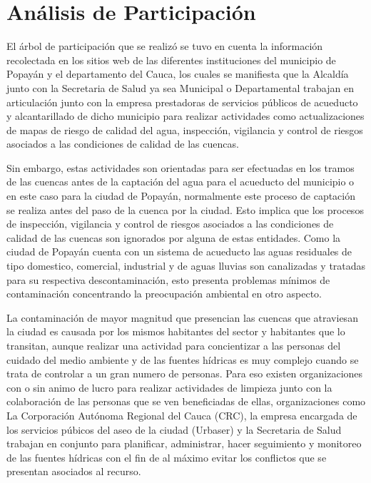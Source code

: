 \section{Análisis de Participación}
  
  El árbol de participación que se realizó se tuvo en cuenta la información recolectada en los sitios web de las diferentes instituciones del municipio de Popayán y el departamento del Cauca, los cuales se manifiesta que la Alcaldía junto con la Secretaria de Salud ya sea Municipal o Departamental trabajan en articulación junto con la empresa prestadoras de servicios públicos de acueducto y alcantarillado de dicho municipio para realizar actividades como actualizaciones de mapas de riesgo de calidad del agua, inspección, vigilancia y control de riesgos asociados a las condiciones de calidad de las cuencas. 

  Sin embargo, estas actividades son orientadas para ser efectuadas en los tramos de las cuencas antes de la captación del agua para el acueducto del municipio o en este caso para la ciudad de Popayán, normalmente este proceso de captación se realiza antes del paso de la cuenca por la ciudad. Esto implica que los procesos de inspección, vigilancia y control de riesgos asociados a las condiciones de calidad de las cuencas son ignorados por alguna de estas entidades. Como la ciudad de Popayán cuenta con un sistema de acueducto las aguas residuales de tipo domestico, comercial, industrial y de aguas lluvias son canalizadas y tratadas para su respectiva descontaminación, esto presenta problemas mínimos de contaminación concentrando la preocupación ambiental en otro aspecto.

  La contaminación de mayor magnitud que presencian las cuencas que atraviesan la ciudad es causada por los mismos habitantes del sector y habitantes que lo transitan, aunque realizar una actividad para concientizar a las personas del cuidado del medio ambiente y de las fuentes hídricas es muy complejo cuando se trata de controlar a un gran numero de personas. Para eso existen organizaciones con o sin animo de lucro para realizar actividades de limpieza junto con la colaboración de las personas que se ven beneficiadas de ellas, organizaciones como La Corporación Autónoma Regional del Cauca (CRC), la empresa encargada de los servicios púbicos del aseo de la ciudad (Urbaser) y la Secretaria de Salud trabajan en conjunto para planificar, administrar, hacer seguimiento y monitoreo de las fuentes hídricas con el fin de al máximo evitar los conflictos que se presentan asociados al recurso.

